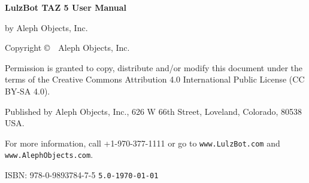 %
%
%
%
%


\clearpage\null\vfill
\begingroup 
\thispagestyle{empty}
\footnotesize\raggedright
\setlength{\parskip}{0.5\baselineskip}

\textbf{LulzBot\textsuperscript{\miniscule{\texttrademark}} TAZ 5 User Manual}

by Aleph Objects, Inc.

Copyright \copyright\ \the\year\ Aleph Objects, Inc.\par
Permission is granted to copy, distribute and\slash or modify 
this document under the terms of the
Creative Commons Attribution 4.0 International Public License
(CC BY-SA 4.0).

Published by Aleph Objects, Inc., 626 W 66th Street, Loveland, Colorado, 80538 USA.

For more information, call +1-970-377-1111 or go to \texttt{www.LulzBot.com} and \texttt{www.AlephObjects.com}.

ISBN: 978-0-9893784-7-5
\renewcommand{\dateseparator}{}
\hfill\texttt{5.0-\yyyymmdddate\today} %
\endgroup
\pagebreak{}
